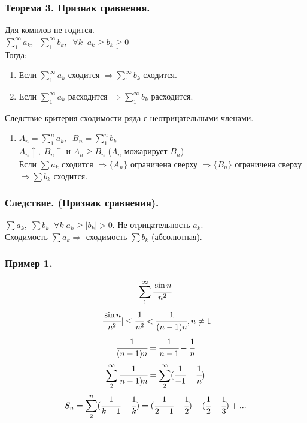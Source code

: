 \documentclass[12pt, a4paper]{article}
\begin{document}
\subsubsection{Теорема 3. Признак сравнения.}
Для комплов не годится.\\
$\sum^{\infty}_{1} a_k,\;\; \sum^{\infty}_{1} b_k,\;\; \forall k\;\; a_k \geq \underline{b_k \geq 0}$\\
Тогда:
\begin{enumerate}
    \item Если $\sum^{\infty}_{1} a_k$ сходится $\Rightarrow \sum^{\infty}_{1} b_k$ сходится.
    \item Если $\sum^{\infty}_{1} a_k$ расходится $\Rightarrow \sum^{\infty}_{1} b_k$ расходится.
\end{enumerate}
\begin{tcolorbox}[title=Доказательство]
Следствие критерия сходимости ряда с неотрицательными членами.\\
\begin{enumerate}
    \item $A_n = \sum^{n}_{1} a_k,\;\; B_n = \sum^{n}_{1} b_k $\\
    $A_n \uparrow,\; B_n \uparrow$ и $A_n \geq B_n$ ($A_n$ можарирует $B_n$)\\
    Если $\sum a_k$ сходится $\Rightarrow \{A_n\}$ ограничена сверху $\Rightarrow \{B_n\}$ ограничена сверху $\Rightarrow \sum b_k$ сходится.
\end{enumerate}
\end{tcolorbox}

\subsubsection{Следствие. (Признак сравнения).}
$\sum a_k,\; \sum b_k \;\; \forall k\; a_k \geq |b_k| > 0$. Не отрицательность $a_k$.\\
Сходимость $\sum a_k \Rightarrow$ сходимость $\sum b_k$ (абсолютная).
\subsubsection*{Пример 1.}
\[\sum^{\infty}_{1} \cfrac{\sin n}{n^2}\]
\[|\cfrac{\sin n}{n^2}| \leq \cfrac{1}{n^2} < \cfrac{1}{(n-1)n}, n \not= 1\]
\[ \cfrac{1}{(n-1)n} = \cfrac{1}{n-1} - \cfrac{1}{n} \]
\[ \sum^{\infty}_{2} \cfrac{1}{n-1)n} = \sum^{\infty}_{2}( \cfrac{1}{-1} - \cfrac{1}{n}) \]
\[ S_n = \sum^{n}_{2} (\cfrac{1}{k-1} - \cfrac{1}{k}) = (\cfrac{1}{2-1} - \cfrac{1}{2}) + (\cfrac{1}{2} - \cfrac{1}{3}) + ... \]
\end{document}
